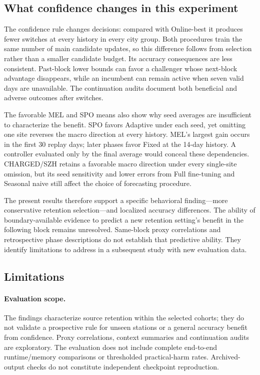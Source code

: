 \documentclass[pdflatex,iicol,sn-mathphys-num]{sn-jnl}
\begin{document}
\subsection{What confidence changes in this experiment}
The confidence rule changes decisions: compared with Online-best it produces fewer switches at every history in every city group. Both procedures train the same number of main candidate updates, so this difference follows from selection rather than a smaller candidate budget. Its accuracy consequences are less consistent. Past-block lower bounds can favor a challenger whose next-block advantage disappears, while an incumbent can remain active when seven valid days are unavailable. The continuation audits document both beneficial and adverse outcomes after switches.

The favorable MEL and SPO means also show why seed averages are insufficient to characterize the benefit. SPO favors Adaptive under each seed, yet omitting one site reverses the macro direction at every history. MEL's largest gain occurs in the first 30 replay days; later phases favor Fixed at the 14-day history. A controller evaluated only by the final average would conceal these dependencies. CHARGED/SZH retains a favorable macro direction under every single-site omission, but its seed sensitivity and lower errors from Full fine-tuning and Seasonal naive still affect the choice of forecasting procedure.

The present results therefore support a specific behavioral finding---more conservative retention selection---and localized accuracy differences. The ability of boundary-available evidence to predict a new retention setting's benefit in the following block remains unresolved. Same-block proxy correlations and retrospective phase descriptions do not establish that predictive ability. They identify limitations to address in a subsequent study with new evaluation data.

\subsection{Limitations}
\paragraph{Evaluation scope.}
The findings characterize source retention within the selected cohorts; they do not validate a prospective rule for unseen stations or a general accuracy benefit from confidence. Proxy correlations, context summaries and continuation audits are exploratory. The evaluation does not include complete end-to-end runtime/memory comparisons or thresholded practical-harm rates. Archived-output checks do not constitute independent checkpoint reproduction.
\end{document}
